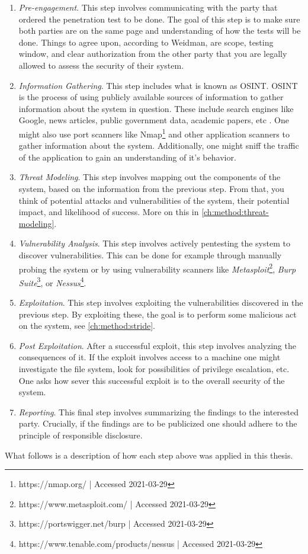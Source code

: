 \begin{enumerate}
    \item \textit{Pre-engagement}. This step involves communicating with the party that ordered the penetration test to be done. The goal of this step is to make sure both parties are on the same page and understanding of how the tests will be done. Things to agree upon, according to Weidman, are scope, testing window, and clear authorization from the other party that you are legally allowed to assess the security of their system.
    \item \textit{Information Gathering}. This step includes what is known as \gls{OSINT}. \gls{OSINT} is the process of using publicly available sources of information to gather information about the system in question. These include search engines like Google, news articles, public government data, academic papers, etc \cite{steele2007open}. One might also use port scanners like Nmap\footnote{https://nmap.org/ | Accessed 2021-03-29} and other application scanners to gather information about the system. Additionally, one might sniff the traffic of the application to gain an understanding of it's behavior.
    \item \textit{Threat Modeling}. This step involves mapping out the components of the system, based on the information from the previous step. From that, you think of potential attacks and vulnerabilities of the system, their potential impact, and likelihood of success. More on this in \ref{ch:method:threat-modeling}.
    \item \textit{Vulnerability Analysis}. This step involves actively pentesting the system to discover vulnerabilities. This can be done for example through manually probing the system or by using vulnerability scanners like \textit{Metasploit}\footnote{https://www.metasploit.com/ | Accessed 2021-03-29}, \textit{Burp Suite}\footnote{https://portswigger.net/burp | Accessed 2021-03-29}, or \textit{Nessus}\footnote{https://www.tenable.com/products/nessus | Accessed 2021-03-29}.
    \item \textit{Exploitation}. This step involves exploiting the vulnerabilities discovered in the previous step. By exploiting these, the goal is to perform some malicious act on the system, see \ref{ch:method:stride}.
    \item \textit{Post Exploitation}. After a successful exploit, this step involves analyzing the consequences of it. If the exploit involves access to a machine one might investigate the file system, look for possibilities of privilege escalation, etc. One asks how sever this successful exploit is to the overall security of the system.
    \item \textit{Reporting}. This final step involves summarizing the findings to the interested party. Crucially, if the findings are to be publicized one should adhere to the principle of responsible disclosure.
\end{enumerate}
What follows is a description of how each step above was applied in this thesis.

